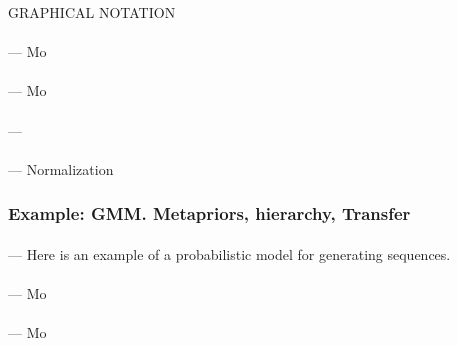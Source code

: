 \documentclass[12pt]{article}
\begin{document}

        GRAPHICAL NOTATION
        \paragraph{\sf} --- Mo
        \paragraph{\sf} --- Mo
        \paragraph{\sf} ---
        \paragraph{\sf} --- Normalization

      \subsubsection*{Example: GMM.  Metapriors, hierarchy, Transfer}
        \paragraph{\sf} --- Here is an example of a probabilistic model for
        generating sequences.
        \paragraph{\sf} --- Mo
        \paragraph{\sf} --- Mo
\end{document}
